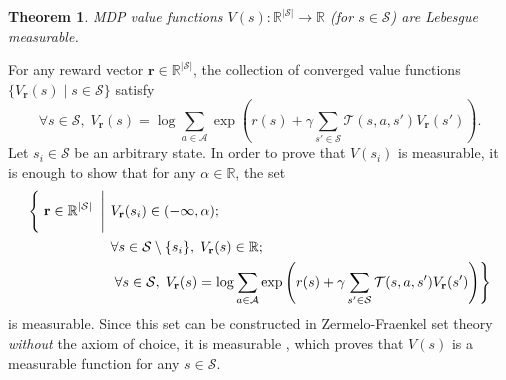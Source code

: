 \documentclass{article}
\newtheorem{theorem}{Theorem}[section]
\newenvironment{proofsketch}{%
  \renewcommand{\proofname}{Proof sketch}\proof}{\endproof}
\theoremstyle{definition}
\begin{document}
\begin{theorem} \label{thm:measurability}
  MDP value functions $V(s) : \mathbb{R}^{|\mathcal{S}|} \to \mathbb{R}$ (for $s
  \in \mathcal{S}$) are Lebesgue measurable.
\end{theorem}
\begin{proofsketch}
  For any reward vector $\mathbf{r} \in \mathbb{R}^{|\mathcal{S}|}$, the
  collection of converged value functions $\{ V_{\mathbf{r}}(s) \mid s \in
  \mathcal{S} \}$ satisfy
  \[ \forall s \in \mathcal{S},\;V_{\mathbf{r}}(s) = \log \sum_{a \in \mathcal{A}}
    \exp\left( r(s) + \gamma\sum_{s' \in \mathcal{S}} \mathcal{T}(s, a,
      s')V_{\mathbf{r}}(s') \right). \]
  Let $s_i \in \mathcal{S}$ be an arbitrary state. In order to prove that
  $V(s_i)$ is measurable, it is enough to show that for any $\alpha \in
  \mathbb{R}$, the
  set
  \[
    \begin{split}
      \left\{ \vphantom{\sum_{a \in \mathcal{A}}} \right. \mathbf{r} \in
      \mathbb{R}^{|\mathcal{S}|} \left. \vphantom{\sum_{a \in \mathcal{A}}} \;
        \middle| \; \right. &V_{\mathbf{r}}(s_i) \in (-\infty, \alpha); \\
      &\forall s \in \mathcal{S} \setminus \{ s_i \}, \; V_{\mathbf{r}}(s) \in
      \mathbb{R}; \\
      &\left. \forall s \in \mathcal{S},\;V_{\mathbf{r}}(s) = \log \sum_{a \in
          \mathcal{A}} \exp\left( r(s) + \gamma\sum_{s' \in \mathcal{S}}
          \mathcal{T}(s, a, s')V_{\mathbf{r}}(s') \right) \right\}
    \end{split}
  \]
  is measurable. Since this set can be constructed in Zermelo-Fraenkel set
  theory \emph{without} the axiom of choice, it is measurable
  \cite{herrlich2006axiom}, which proves that $V(s)$ is a measurable function
  for any $s \in \mathcal{S}$.
\end{proofsketch}
\end{document}
